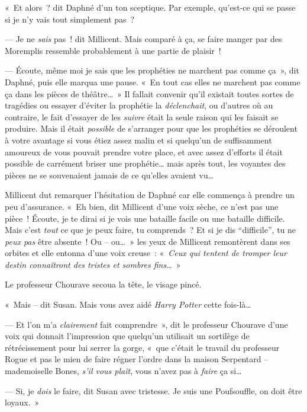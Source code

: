 «~Et alors~? dit Daphné d'un ton sceptique.
Par exemple, qu'est-ce qui se passe si je n'y vais tout simplement pas~?

--- Je ne \emph{sais} pas~! dit Millicent.
Mais comparé à ça, se faire manger par des Moremplis ressemble probablement à une partie de plaisir~!

--- Écoute, même moi je sais que les prophéties ne marchent pas comme ça~», dit Daphné, puis elle marqua une pause.
«~En tout cas elles ne marchent pas comme ça dans les pièces de théâtre…~»
Il fallait convenir qu'il existait toutes sortes de tragédies ou essayer d'éviter la prophétie la \emph{déclenchait}, ou d'autres où au contraire, le fait d'essayer de les \emph{suivre} était la seule raison qui les faisait se produire.
Mais il était \emph{possible} de s'arranger pour que les prophéties se déroulent à votre avantage si vous étiez assez malin et si quelqu'un de suffisamment amoureux de vous pouvait prendre votre place, et avec assez d'efforts il était possible de carrément briser une prophétie… mais après tout, les voyantes des pièces ne se souvenaient jamais de ce qu'elles avaient vu…

Millicent dut remarquer l'hésitation de Daphné car elle commença à prendre un peu d'assurance.
«~Eh bien, dit Millicent d'une voix sèche, ce n'est pas une pièce~!
Écoute, je te dirai si je vois une bataille facile ou une bataille difficile.
Mais c'est \emph{tout} ce que je peux faire, tu comprends~?
Et si je dis “difficile”, tu ne \emph{peux pas} être absente~!
Ou -- ou…~»
les yeux de Millicent remontèrent dans ses orbites et elle entonna d'une voix creuse~: «~\emph{Ceux qui tentent de tromper leur destin connaîtront des tristes et sombres fins…}~»

\later

Le professeur Chourave secoua la tête, le visage pincé.

«~Mais -- dit Susan.
Mais vous avez aidé \emph{Harry Potter} cette fois-là…

--- Et l'on m'a \emph{clairement} fait comprendre~», dit le professeur Chourave d'une voix qui donnait l'impression que quelqu'un utilisait un sortilège de rétrécissement pour lui serrer la gorge, «~que c'était le travail du professeur Rogue et pas le mien de faire régner l'ordre dans la maison Serpentard -- mademoiselle Bones, \emph{s'il vous plaît}, vous n'avez pas à \emph{faire} ça si…

--- Si, je \emph{dois} le faire, dit Susan avec tristesse.
Je suis une Poufsouffle, on doit être loyaux.~»

